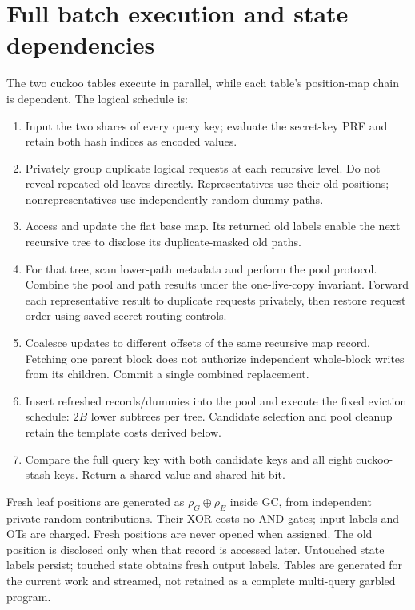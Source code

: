 \documentclass[11pt]{article}
\newcommand{\xor}{\mathbin{\oplus}}
\begin{document}
\section{Full batch execution and state dependencies}
\label{sec:pipeline}
The two cuckoo tables execute in parallel, while each table's position-map
chain is dependent. The logical schedule is:
\begin{enumerate}
\item Input the two shares of every query key; evaluate the secret-key PRF
and retain both hash indices as encoded values.
\item Privately group duplicate logical requests at each recursive level.
Do not reveal repeated old leaves directly. Representatives use their old
positions; nonrepresentatives use independently random dummy paths.
\item Access and update the flat base map. Its returned old labels enable
the next recursive tree to disclose its duplicate-masked old paths.
\item For that tree, scan lower-path metadata and perform the pool protocol.
Combine the pool and path results under the one-live-copy invariant.
Forward each representative result to duplicate requests privately, then
restore request order using saved secret routing controls.
\item Coalesce updates to different offsets of the same recursive map
record. Fetching one parent block does not authorize independent whole-block
writes from its children. Commit a single combined replacement.
\item Insert refreshed records/dummies into the pool and execute the fixed
eviction schedule: $2B$ lower subtrees per tree. Candidate selection and
pool cleanup retain the template costs derived below.
\item Compare the full query key with both candidate keys and all eight
cuckoo-stash keys. Return a shared value and shared hit bit.
\end{enumerate}

Fresh leaf positions are generated as $\rho_G\xor\rho_E$ inside GC, from
independent private random contributions. Their XOR costs no AND gates;
input labels and OTs are charged. Fresh positions are never opened when
assigned. The old position is disclosed only when that record is accessed
later. Untouched state labels persist; touched state obtains fresh output
labels. Tables are generated for the current work and streamed, not retained
as a complete multi-query garbled program.
\end{document}
